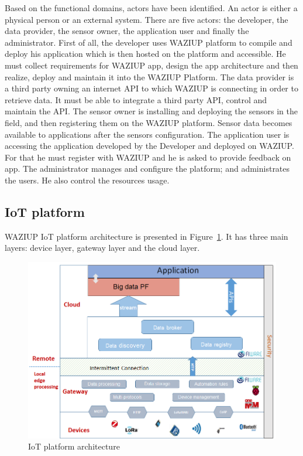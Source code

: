 Based on the functional domains, actors have been identified. 
An actor is either a physical person or an external system. 
There are five actors: the developer, the data provider, the sensor owner, the application user and finally the administrator.
First of all, the developer uses WAZIUP platform to compile and deploy his application which is then hosted on the platform and accessible.
He must collect requirements for WAZIUP app, design the app architecture and then realize, deploy and maintain it into the WAZIUP Platform.
The data provider is a third party owning an internet API to which WAZIUP is connecting in order to retrieve data. It must be able to integrate a third party API, control and maintain the API.
The sensor owner is installing and deploying the sensors in the field, and then registering them on the WAZIUP platform. Sensor data becomes available to applications after the sensors configuration.
The application user is accessing the application developed by the Developer and deployed on WAZIUP. For that he must register with WAZIUP and he is asked to provide feedback on app. 
The administrator manages and configure the platform; and administrates the users. He also control the resources usage. 

\subsection{IoT platform}

WAZIUP IoT platform architecture is presented in Figure~\ref{fig:iotarchi}.
It has three main layers: device layer, gateway layer and the cloud layer.

\begin{figure}[h]
\centering
\includegraphics[width=\textwidth]{figs/iotarchi.png}
\caption{IoT platform architecture}
\label{fig:iotarchi}
\end{figure}


